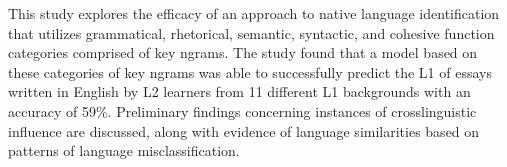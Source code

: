 This study explores the efficacy of an approach to native language identification that utilizes grammatical, rhetorical, semantic, syntactic, and
 cohesive function categories comprised of key ngrams. The study found that a
 model based on these categories of key ngrams was able to successfully predict
 the L1 of essays written in English by L2 learners from 11 different L1
 backgrounds with an accuracy of 59\%. Preliminary findings concerning instances
 of crosslinguistic influence are discussed, along with evidence of language
 similarities based on patterns of language misclassification.

